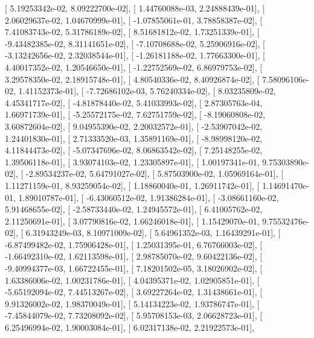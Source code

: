 \documentclass{article}
\begin{document}
       [  5.19253342e-02,   8.09222700e-02],
       [  1.44760088e-03,   2.24888439e-01],
       [  2.06029637e-02,   1.04670999e-01],
       [ -1.07855061e-01,   3.78858387e-02],
       [  7.41083743e-02,   5.31786189e-02],
       [  8.51681812e-02,   1.73251339e-01],
       [ -9.43482385e-02,   8.31141651e-02],
       [ -7.10708688e-02,   5.25906916e-02],
       [ -3.13242656e-02,   2.32038544e-01],
       [ -1.26181188e-02,   1.77663300e-01],
       [  4.40017352e-02,   1.20546650e-01],
       [ -1.22752569e-02,   6.86979753e-02],
       [  3.29578350e-02,   2.18915748e-01],
       [  4.80540336e-02,   8.40926874e-02],
       [  7.58096106e-02,   1.41152373e-01],
       [ -7.72686102e-03,   5.76240334e-02],
       [  8.03235809e-02,   4.45341717e-02],
       [ -4.81878440e-02,   5.41033993e-02],
       [  2.87305763e-04,   1.66971739e-01],
       [ -5.25572175e-02,   7.62751759e-02],
       [ -8.19060808e-02,   3.60872604e-02],
       [  9.04955390e-02,   2.20032572e-01],
       [ -2.53907042e-02,   1.24401830e-01],
       [  2.71333520e-03,   1.35891169e-01],
       [ -8.98998120e-02,   4.11844473e-02],
       [ -5.07347696e-02,   8.06863542e-02],
       [  7.25148255e-02,   1.39506118e-01],
       [  3.93074103e-02,   1.23305897e-01],
       [  1.00197341e-01,   9.75303890e-02],
       [ -2.89534237e-02,   5.64791027e-02],
       [  5.87503900e-02,   1.05969164e-01],
       [  1.11271159e-01,   8.93259054e-02],
       [  1.18860040e-01,   1.26911742e-01],
       [  1.14691470e-01,   1.89010787e-01],
       [ -6.43060512e-02,   1.91386284e-01],
       [ -3.08661160e-02,   5.91468655e-02],
       [ -2.58733440e-02,   1.24945572e-01],
       [  6.41005762e-02,   2.11250691e-01],
       [  3.07790816e-02,   1.66246018e-01],
       [  1.15429070e-01,   9.75532476e-02],
       [  6.31943249e-03,   8.10971009e-02],
       [  5.64961352e-03,   1.16439291e-01],
       [ -6.87499482e-02,   1.75906428e-01],
       [  1.25031395e-01,   6.76766003e-02],
       [ -1.66492310e-02,   1.62113598e-01],
       [  2.98785070e-02,   9.60422136e-02],
       [ -9.40994377e-03,   1.66722455e-01],
       [  7.18201502e-05,   3.18026902e-02],
       [  1.63386006e-02,   1.00231786e-01],
       [  4.04395371e-02,   1.02905851e-01],
       [ -5.65192094e-02,   7.44513267e-02],
       [  3.69227264e-02,   1.31438661e-01],
       [  9.91326002e-02,   1.98370049e-01],
       [  5.14134223e-02,   1.93786747e-01],
       [ -7.45844079e-02,   7.73208092e-02],
       [  5.95708153e-03,   2.06628723e-01],
       [  6.25496994e-02,   1.90003084e-01],
       [  6.02317138e-02,   2.21922573e-01],
\end{document}
